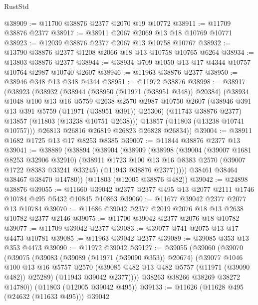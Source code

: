 \begin{lexlean}{RustStd}
\begin{coremodule}
@38909 := @11700 @38876 @2377 @2070 @19 @10772
@38911 := @11709 @38876 @2377
@38917 := @38911 @2067 @2069 @13 @18 @10769 @10771
@38923 := @12039 @38876 @2377 @2067 @13 @10758 @10767
@38932 := @13790 @38876 @2377 @1208 @2066 @18 @13 @10758 @10765 @6264
@38934 := @13803 @38876 @2377
@38944 := @38934 @709 @1050 @13 @17 @4344 @10757 @10764 @2987 @10740 @2607
@38946 := @11963 @38876 @2377
@38950 := @38946 @348 @13 @348 @4344
@38951 := @11972 @38876
@38998 := @38917
    (@38923
      (@38932
        (@38944
          (@38950 (@11971 (@38951 @348)) @20384)
          (@38934
            @1048
            @100
            @13
            @16
            @5759
            @2638
            @2570
            @2987
            @10750
            @2607
            (@38946 @391 @13 @391 @5759 (@11971 (@38951 @391)) @25306)
            (@11743 @38876 @2377)
            @13857
            (@11803 (@13238 @10751 @2638)))
          @13857
          (@11803 (@13238 @10741 @10757)))
        @26813
        @26816
        @26819
        @26823
        @26828
        @26834))
@39004 := @38911 @1682 @1725 @13 @17 @8253 @8385
@39007 := @11844 @38876 @2377 @13
@39041 := @38889
    (@38894
      (@38904
        (@38909
          (@38998
            (@39004
              (@39007 @1681 @8253 @32906 @32910)
              (@38911
                @1723
                @100
                @13
                @16
                @8383
                @2570
                (@39007 @1722 @8383 @33241 @33245)
                (@11943 @38876 @2377)))))
        @38461
        @38464
        @38467
        @38470
        @14780))
    (@11803 (@12005 @38876 @482))
@39042 := @24898 @38876
@39055 := @11660 @39042 @2377 @2377 @495 @13 @2077 @2111 @1746 @10784 @495 @5432 @10845 @10863
@39060 := @11677 @39042 @2377 @2077 @13 @10784
@39070 := @11686 @39042 @2377 @2019 @2076 @18 @13 @2638 @10782 @2377 @2146
@39075 := @11700 @39042 @2377 @2076 @18 @10782
@39077 := @11709 @39042 @2377
@39083 := @39077 @741 @2075 @13 @17 @4473 @10781
@39085 := @11963 @39042 @2377
@39089 := @39085 @353 @13 @353 @4473
@39090 := @11972 @39042
@39127 := @39055
    (@39060
      (@39070
        (@39075
          (@39083
            (@39089 (@11971 (@39090 @353)) @20674)
            (@39077
              @1046
              @100
              @13
              @16
              @5757
              @2570
              (@39085 @482 @13 @482 @5757 (@11971 (@39090 @482)) @25289)
              (@11943 @39042 @2377))))
        @38263
        @38266
        @38269
        @38272
        @14780))
    (@11803 (@12005 @39042 @495))
@39133 := @11626 (@11628 @495 (@24632 (@11633 @495))) @39042

\end{coremodule}
\end{lexlean}
